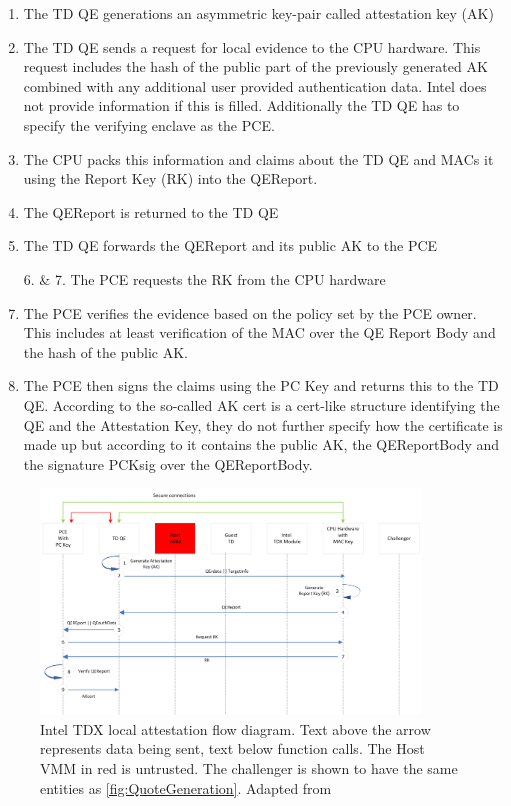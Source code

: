 \begin{enumerate}
    \item The TD QE generations an asymmetric key-pair called attestation key (AK)
    \item The TD QE sends a request for local evidence to the CPU hardware. This request includes the hash of the public part of the previously generated AK combined with any additional user provided authentication data. Intel does not provide information if this is filled. Additionally the TD QE has to specify the verifying enclave as the PCE.
    \item The CPU packs this information and claims about the TD QE and MACs it using the Report Key (RK) into the QEReport.
    \item The QEReport is returned to the TD QE
    \item The TD QE forwards the QEReport and its public AK to the PCE
    \item[6. \& 7.] The PCE requests the RK from the CPU hardware
    \item The PCE verifies the evidence based on the policy set by the PCE owner. This includes at least verification of the MAC over the QE Report Body and the hash of the public AK.
    \item The PCE then signs the claims using the PC Key and returns this to the TD QE. According to \cite{scarlata_supporting_nodate} the so-called AK cert is a cert-like structure identifying the QE and the Attestation Key, they do not further specify how the certificate is made up but according to \cite{sardar_formal_spec_ARM_2024} it contains the public AK, the QEReportBody and the signature PCKsig over the QEReportBody.
    
\end{enumerate}

\begin{figure}
\centering
\includegraphics[width=0.9\textwidth]{figures/Local Attestation.png}
\caption{Intel TDX local attestation flow diagram. Text above the arrow represents data being sent, text below function calls. The Host VMM in red is untrusted. The challenger is shown to have the same entities as \cref{fig:QuoteGeneration}. Adapted from \cite{sardar_formal_2023}}
\label{fig:local-attestation}
\end{figure}

